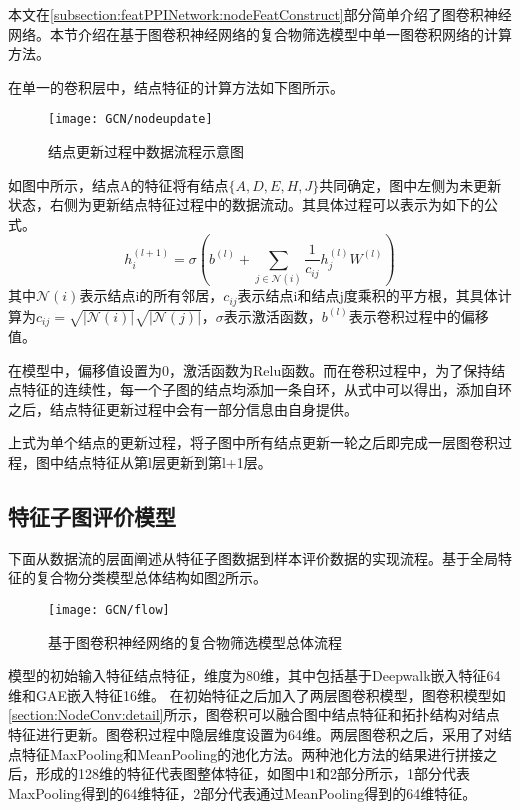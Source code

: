 本文在\ref{subsection:featPPINetwork:nodeFeatConstruct}部分简单介绍了图卷积神经网络。本节介绍在基于图卷积神经网络的复合物筛选模型中单一图卷积网络的计算方法。

在单一的卷积层中，结点特征的计算方法如下图所示。

\begin{figure}[htbp]
    \centering
    \texttt{[image: GCN/nodeupdate]}
    \caption{结点更新过程中数据流程示意图}
    \label{fig:GCN/nodeupdate}
\end{figure}
如图中所示，结点A的特征将有结点$\{A,D,E,H,J\}$共同确定，图中左侧为未更新状态，右侧为更新结点特征过程中的数据流动。其具体过程可以表示为如下的公式。
\begin{equation}
    \label{equ:normalgcn}
    h_i^{(l+1)} = \sigma(b^{(l)} + \sum_{j\in\mathcal{N}(i)}\frac{1}{c_{ij}}h_j^{(l)}W^{(l)})
\end{equation}
其中$\mathcal{N}(i)$表示结点i的所有邻居，${c_{ij}}$表示结点i和结点j度乘积的平方根，其具体计算为$c_{ij} = \sqrt{|\mathcal{N}(i)|}\sqrt{|\mathcal{N}(j)|}$，$\sigma$表示激活函数，$b^{(l)}$表示卷积过程中的偏移值。

在模型中，偏移值设置为0，激活函数为Relu函数。而在卷积过程中，为了保持结点特征的连续性，每一个子图的结点均添加一条自环，从式中可以得出，添加自环之后，结点特征更新过程中会有一部分信息由自身提供。

上式为单个结点的更新过程，将子图中所有结点更新一轮之后即完成一层图卷积过程，图中结点特征从第l层更新到第l+1层。

\subsection{特征子图评价模型}
\label{subsection:NodeConv:flow}

下面从数据流的层面阐述从特征子图数据到样本评价数据的实现流程。基于全局特征的复合物分类模型总体结构如图\ref{fig:GCN/flow}所示。
\begin{figure}[htbp]
    \centering
    \texttt{[image: GCN/flow]}
    \caption{基于图卷积神经网络的复合物筛选模型总体流程}
    \label{fig:GCN/flow}
\end{figure}
模型的初始输入特征结点特征，维度为80维，其中包括基于Deepwalk嵌入特征64维和GAE嵌入特征16维。
在初始特征之后加入了两层图卷积模型，图卷积模型如\ref{section:NodeConv:detail}所示，图卷积可以融合图中结点特征和拓扑结构对结点特征进行更新。图卷积过程中隐层维度设置为64维。两层图卷积之后，采用了对结点特征MaxPooling和MeanPooling的池化方法。两种池化方法的结果进行拼接之后，形成的128维的特征代表图整体特征，如图中1和2部分所示，1部分代表MaxPooling得到的64维特征，2部分代表通过MeanPooling得到的64维特征。

